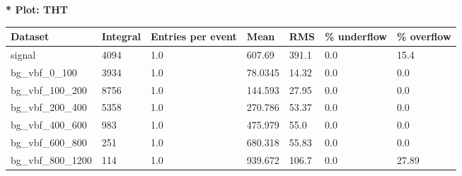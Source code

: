\documentclass[a4paper, 10pt]{article}
\begin{document}
\textbf{* Plot: THT}\\
   \begin{table}[H]
  \begin{center}
    \begin{tabular}{|m{23.0mm}|m{23.0mm}|m{18.0mm}|m{19.0mm}|m{19.0mm}|m{19.0mm}|m{19.0mm}|}
      \hline
      {\cellcolor{yellow}         Dataset}& {\cellcolor{yellow}         Integral}& {\cellcolor{yellow}         Entries per event}& {\cellcolor{yellow}         Mean}& {\cellcolor{yellow}         RMS}& {\cellcolor{yellow}         \% underflow}& {\cellcolor{yellow}         \% overflow}\\
      \hline
      {\cellcolor{white}         signal}& {\cellcolor{white}         4094}& {\cellcolor{white}         1.0}& {\cellcolor{white}         607.69}& {\cellcolor{white}         391.1}& {\cellcolor{red}         0.0}& {\cellcolor{red}         15.4}\\
      \hline
      {\cellcolor{white}         bg\_vbf\_0\_100}& {\cellcolor{white}         3934}& {\cellcolor{white}         1.0}& {\cellcolor{white}         78.0345}& {\cellcolor{white}         14.32}& {\cellcolor{green}         0.0}& {\cellcolor{green}         0.0}\\
      \hline
      {\cellcolor{white}         bg\_vbf\_100\_200}& {\cellcolor{white}         8756}& {\cellcolor{white}         1.0}& {\cellcolor{white}         144.593}& {\cellcolor{white}         27.95}& {\cellcolor{green}         0.0}& {\cellcolor{green}         0.0}\\
      \hline
      {\cellcolor{white}         bg\_vbf\_200\_400}& {\cellcolor{white}         5358}& {\cellcolor{white}         1.0}& {\cellcolor{white}         270.786}& {\cellcolor{white}         53.37}& {\cellcolor{green}         0.0}& {\cellcolor{green}         0.0}\\
      \hline
      {\cellcolor{white}         bg\_vbf\_400\_600}& {\cellcolor{white}         983}& {\cellcolor{white}         1.0}& {\cellcolor{white}         475.979}& {\cellcolor{white}         55.0}& {\cellcolor{green}         0.0}& {\cellcolor{green}         0.0}\\
      \hline
      {\cellcolor{white}         bg\_vbf\_600\_800}& {\cellcolor{white}         251}& {\cellcolor{white}         1.0}& {\cellcolor{white}         680.318}& {\cellcolor{white}         55.83}& {\cellcolor{green}         0.0}& {\cellcolor{green}         0.0}\\
      \hline
      {\cellcolor{white}         bg\_vbf\_800\_1200}& {\cellcolor{white}         114}& {\cellcolor{white}         1.0}& {\cellcolor{white}         939.672}& {\cellcolor{white}         106.7}& {\cellcolor{red}         0.0}& {\cellcolor{red}         27.89}\\

\end{tabular}
\end{center}
\end{table}
\end{document}
